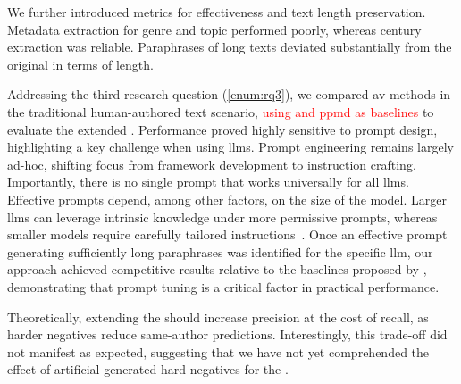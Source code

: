 We further introduced metrics for \pextractor{} effectiveness and text length preservation. 
Metadata extraction for genre and topic performed poorly, whereas century extraction was reliable. 
Paraphrases of long \dataGutenberg{} texts deviated substantially from the original in terms of length.  


Addressing the third research question (\autoref{enum:rq3}), we compared \ac{av} methods in the traditional human-authored text scenario, \textcolor{red}{using \unmasking{} and \ac{ppmd} as baselines} to evaluate the extended \impAppr{}.
Performance proved highly sensitive to prompt design, highlighting a key challenge when using \acp{llm}. 
Prompt engineering remains largely ad-hoc, shifting focus from framework development to instruction crafting. 
Importantly, there is no single prompt that works universally for all \acp{llm}. 
Effective prompts depend, among other factors, on the size of the model. 
Larger \acp{llm} can leverage intrinsic knowledge under more permissive prompts, whereas smaller models require carefully tailored instructions~\citep{schmidt_llm_av_latin_24}.
Once an effective prompt generating sufficiently long paraphrases was identified for the specific \ac{llm}, our approach achieved competitive results relative to the baselines proposed by \citet{koppel_determining_2014}, demonstrating that prompt tuning is a critical factor in practical performance.

Theoretically, extending the \impAppr{} should increase precision at the cost of recall, as harder negatives reduce same-author predictions. 
Interestingly, this trade-off did not manifest as expected, suggesting that we have not yet comprehended the effect of artificial generated hard negatives for the \impAppr{}.